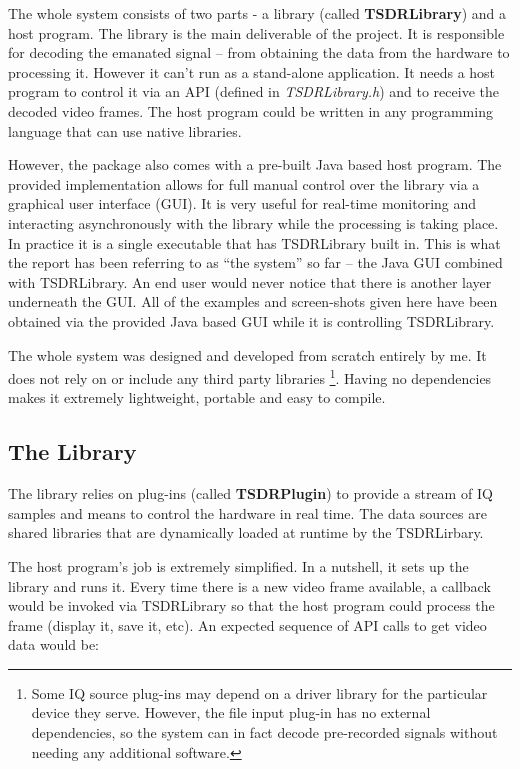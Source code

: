 \documentclass[a4paper,12pt,twoside,openright]{report}
\begin{document}
The whole system consists of two parts - a library (called \textbf{TSDRLibrary}) and a host program. The library is the main deliverable of the project. It is responsible for decoding the emanated signal -- from obtaining the data from the hardware to processing it. However it can't run as a stand-alone application. It needs a host program to control it via an API (defined in \textit{TSDRLibrary.h}) and to receive the decoded video frames. The host program could be written in any programming language that can use native libraries.

However, the package also comes with a pre-built Java based host program. The provided implementation allows for full manual control over the library via a graphical user interface (GUI). It is very useful for real-time monitoring and interacting asynchronously with the library while the processing is taking place. In practice it is a single executable that has TSDRLibrary built in. This is what the report has been referring to as ``the system'' so far -- the Java GUI combined with TSDRLibrary. An end user would never notice that there is another layer underneath the GUI. All of the examples and screen-shots given here have been obtained via the provided Java based GUI while it is controlling TSDRLibrary.

The whole system was designed and developed from scratch entirely by me. It does not rely on or include any third party libraries \footnote{Some IQ source plug-ins may depend on a driver library for the particular device they serve. However, the file input plug-in has no external dependencies, so the system can in fact decode pre-recorded signals without needing any additional software.}. Having no dependencies makes it extremely lightweight, portable and easy to compile. 

\subsection{The Library}

The library relies on plug-ins (called \textbf{TSDRPlugin}) to provide a stream of IQ samples and means to control the hardware in real time. The data sources are shared libraries that are dynamically loaded at runtime by the TSDRLirbary.

The host program's job is extremely simplified. In a nutshell, it sets up the library and runs it. Every time there is a new video frame available, a callback would be invoked via TSDRLibrary so that the host program could process the frame (display it, save it, etc). An expected sequence of API calls to get video data would be:
\end{document}

